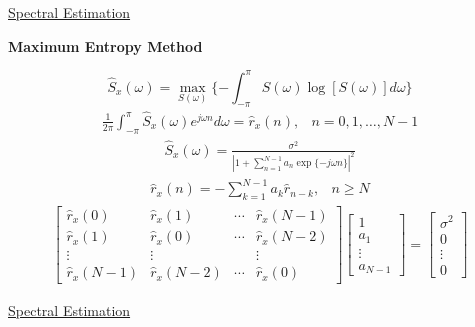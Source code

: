 \begin{slide}
{}
{\tiny\underline{Spectral Estimation}}
\begin{center}
{\bf Maximum Entropy Method}
\end{center}
\vfill
\vbox{
{\tiny
%
$$
\hat{S}_x(\omega) = 
\max_{S(\omega)}\{-\int_{-\pi}^{\pi}S(\omega)\log[S(\omega)]d\omega\}
$$
%
\vfil
%
$$
\begin{array}{cc}
{\displaystyle 
\frac{1}{2\pi}\int_{-\pi}^{\pi}\hat{S}_x(\omega)e^{j\omega n}d\omega 
= \hat{r}_x(n)}, & \mbox{$n=0,1,\ldots,N-1$}
\end{array}
$$
%
\vfil
%
$$
\begin{array}{cc}
     \hat{S}_x(\omega)=
\frac{\sigma^2}{|1+\sum_{n=1}^{N-1}a_n\exp\{-j\omega n\}|^2}
\end{array}
$$
%
\vfil
%
$$
\begin{array}{cc}
{\displaystyle \hat{r}_x(n) = -\sum_{k=1}^{N-1}a_k\hat{r}_{n-k}}, & n\ge N
\end{array}
$$
%
\vfil
%
$$
\begin{array}{cc}
\left[ \begin{array}{cccc}
\hat{r}_x(0) & \hat{r}_x(1) & \cdots & \hat{r}_x(N-1) \\
\hat{r}_x(1) & \hat{r}_x(0) & \cdots & \hat{r}_x(N-2) \\
\vdots       & \vdots       &        & \vdots \\
\hat{r}_x(N-1) & \hat{r}_x(N-2) & \cdots & \hat{r}_x(0) 
\end{array}\right]
\left[ \begin{array}{c}
1\\
a_1\\
\vdots\\
a_{N-1}
\end{array}\right]
=
\left[ \begin{array}{c}
\sigma^2\\
0\\
\vdots\\
0
\end{array}\right]
\end{array}
$$
%
}}
\vfill
\end{slide}
\begin{slide}
{}
{\tiny\underline{Spectral Estimation}}
\vfill
\vbox{
}
\vfill
\vbox{
}
\vfill
\end{slide}
